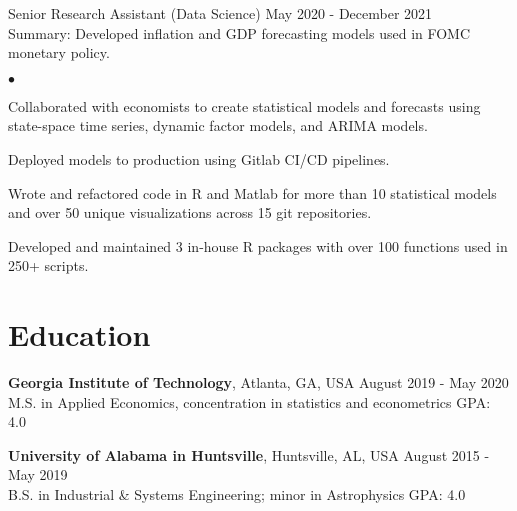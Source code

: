\documentclass[margin, line]{res}
\newenvironment{list2}{
  \begin{list}{$\bullet$}{%
      \setlength{\itemsep}{0.04in}
      \setlength{\parsep}{0in} \setlength{\parskip}{0in}
      \setlength{\topsep}{0.05in} \setlength{\partopsep}{0in} 
      \setlength{\leftmargin}{\dimexpr 26pt-0.05in}}}
    {\end{list}}
\begin{document}
\begin{resume}
Senior Research Assistant (Data Science) \hfill May 2020 - December 2021 \\
\hspace*{3mm}
    Summary: Developed inflation and GDP forecasting models used in FOMC monetary policy.
    
    \begin{list2}
        \item Collaborated with economists to create statistical models and forecasts using state-space time series, dynamic factor models, and ARIMA models.
        \item Deployed models to production using Gitlab CI/CD pipelines.
        \item Wrote and refactored code in R and Matlab for more than 10 statistical models and over 50 unique visualizations across 15 git repositories. 
        \item Developed and maintained 3 in-house R packages with over 100 functions used in 250+ scripts.
    \end{list2}


\section{\sc Education }

{\bf Georgia Institute of Technology}, Atlanta, GA, USA \hfill August 2019 - May 2020\\
M.S. in Applied Economics, concentration in statistics and econometrics \hfill GPA: 4.0


{\bf University of Alabama in Huntsville}, Huntsville, AL, USA \hfill August 2015 - May 2019 \\
B.S. in Industrial \& Systems Engineering; minor in Astrophysics \hfill GPA: 4.0

\end{resume}
\end{document}
